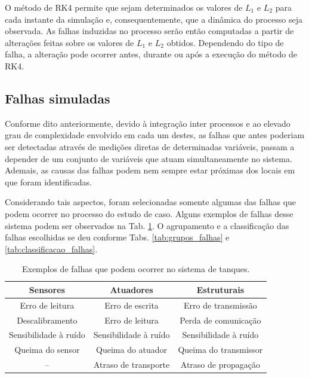 O método de RK4 permite que sejam determinados os valores de $L_1$ e $L_2$ para
cada instante da simulação e, consequentemente, que a dinâmica do processo seja
observada. As falhas induzidas no processo serão então computadas a partir de
alterações feitas sobre os valores de $L_1$ e $L_2$ obtidos. Dependendo do tipo
de falha, a alteração pode ocorrer antes, durante ou após a execução do método
de RK4.

\subsection{Falhas simuladas}
Conforme dito anteriormente, devido à integração inter processos e ao elevado
grau de complexidade envolvido em cada um destes, as falhas que antes poderiam
ser detectadas através de medições diretas de determinadas variáveis, passam a
depender de um conjunto de variáveis que atuam simultaneamente no sistema.
Ademais, as causas das falhas podem nem sempre estar próximas dos locais em que
foram identificadas.

Considerando tais aspectos, foram selecionadas somente algumas das falhas que
podem ocorrer no processo do estudo de caso. Alguns exemplos de falhas desse
sistema podem ser observados na Tab. \ref{tab:selecao_falhas}. O agrupamento e a
classificação das falhas escolhidas se deu conforme Tabs.
\ref{tab:grupos_falhas} e \ref{tab:classificacao_falhas}.

\begin{table}[htb]
\centering
\caption{Exemplos de falhas que podem ocorrer no sistema de tanques.}
\label{tab:selecao_falhas}
\vspace{0.25cm}
\begin{tabular}{|c|c|c|}
\hline
{\bf Sensores} & {\bf Atuadores} & {\bf Estruturais}\\
\hline
\hline
Erro de leitura & Erro de escrita & Erro de transmissão\\
\hline
Descalibramento & Erro de leitura & Perda de comunicação\\
\hline
Sensibilidade à ruído & Sensibilidade à ruído & Sensibilidade à ruído\\
\hline
Queima do sensor & Queima do atuador & Queima do transmissor\\
\hline
-- & Atraso de transporte & Atraso de propagação\\
\hline
\end{tabular}
\end{table}

